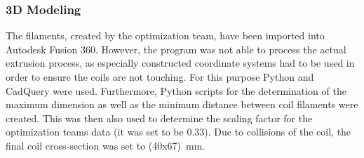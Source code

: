 \subsubsection{3D Modeling}
The filaments, created by the optimization team, have been imported into Autodesk Fusion 360. However, the program was not able to process the actual extrusion process, as especially constructed coordinate systems had to be used in order to ensure the coils are not touching.
For this purpose Python and CadQuery were used. %
Furthermore, Python scripts for the determination of the maximum dimension as well as the minimum distance between coil filaments were created.
This was then also used to determine the scaling factor for the optimization teams data (it was set to be 0.33).
Due to collisions of the coil, the final coil cross-section was set to (40x67)~mm.\\


